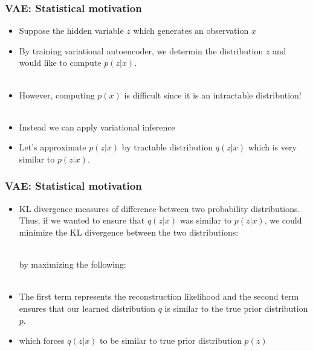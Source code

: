 
\begin{frame}
\frametitle{VAE: Statistical motivation}

\begin{itemize}
\item Suppose the hidden variable $z$ which generates an observation $x$
\pause
\item By training variational autoencoder, we determin the distribution $z$ and would like to compute $p(z|x)$. \\
\\
\vspace{5pt}
\pause
\item \raggedright{However, computing $p(x)$ is difficult since it is an intractable distribution!} \\
\\
\vspace{5pt}
\pause
\item \raggedright{Instead we can apply variational inference} \\
\pause
\item \raggedright{Let's approximate $p(z|x)$ by tractable distribution $q(z|x)$ which is very similar to $p(z|x)$.} \\

\end{itemize}
\end{frame}


\begin{frame}
\frametitle{VAE: Statistical motivation}

\begin{itemize}
\item \raggedright{KL divergence measures of difference between two probability distributions. Thus, if we wanted to ensure that $q(z|x)$ was similar to $p(z|x)$, we could minimize the KL divergence between the two distributions:} \\
 \\
\pause
\raggedright{by maximizing the following:}\\
\pause
{} \\
\vspace{5pt}
\item \raggedright{The first term represents the reconstruction likelihood and the second term ensures that our learned distribution $q$ is similar to the true prior distribution $p$.}
\item which forces $q(z|x)$ to be similar to true prior distribution $p(z)$

\end{itemize}
\end{frame}

